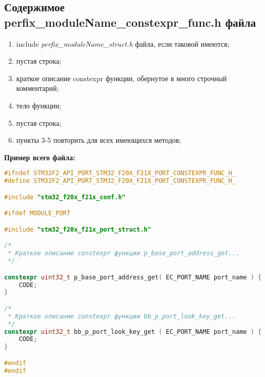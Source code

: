 \subsection{Содержимое perfix\_moduleName\_constexpr\_func.h файла}\label{p:conf:h}
\begin{enumerate}
	\item include \textit{perfix\_moduleName\_struct.h} файла, если таковой имеются;
	\item пустая строка;
	\item краткое описание constexpr функции, обернутое в много строчный комментарий;
	\item тело функции;
	\item пустая строка;
	\item пункты 3-5 повторить для всех имеющихся методов;
\end{enumerate}
\textbf{Пример всего файла:}\begin{lstlisting}[language=C++, frame=tlBR, basicstyle=\fontsize{10}{10}\ttfamily]
#ifndef STM32F2_API_PORT_STM32_F20X_F21X_PORT_CONSTEXPR_FUNC_H_
#define STM32F2_API_PORT_STM32_F20X_F21X_PORT_CONSTEXPR_FUNC_H_

#include "stm32_f20x_f21x_conf.h"

#ifdef MODULE_PORT

#include "stm32_f20x_f21x_port_struct.h"

/*
 * Краткое описание constexpr функции p_base_port_address_get...
 */

constexpr uint32_t p_base_port_address_get( EC_PORT_NAME port_name ) {
	CODE;
}

/*
 * Краткое описание constexpr функции bb_p_port_look_key_get...
 */
constexpr uint32_t bb_p_port_look_key_get ( EC_PORT_NAME port_name ) {
	CODE;
}

#endif
#endif
\end{lstlisting}

